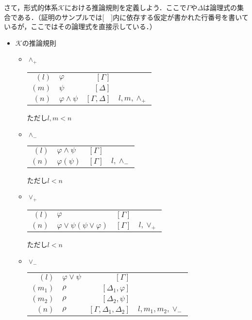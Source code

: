 \documentclass[10pt,b5paper,papersize,dvipdfmx]{jsbook}
\begin{document}
さて，形式的体系$\mathcal K$における推論規則を定義しよう．ここで$\Gamma$や$\Delta$は論理式の集合である．（証明のサンプルでは[　]内に依存する仮定が書かれた行番号を書いているが，ここではその論理式を直接示している．）
\begin{itemize}
\item $\mathcal K$の推論規則
\begin{itemize}
\item $\land_+$
\begin{table}[H]
\begin{center}
\begin{tabular}{rlrl}
$(l)$&$\varphi$&$[\Gamma]$& \\
$(m)$&$\psi$&$[\Delta]$& \\
$(n)$&$\varphi \land \psi$&$[\Gamma,\Delta]$&$l,m,\land_+$
\end{tabular}
\end{center}
\end{table}
ただし$l,m<n$
\item $\land_-$
\begin{table}[H]
\begin{center}
\begin{tabular}{rlrl}
$(l)$&$\varphi \land \psi$&$[\Gamma]$& \\
$(n)$&$\varphi (\psi)$&$[\Gamma]$&$l,\land_-$ \\
\end{tabular}
\end{center}
\end{table}
ただし$l<n$
\item $\lor_+$
\begin{table}[H]
\begin{center}
\begin{tabular}{rlrl}
$(l)$&$\varphi$&$[\Gamma]$& \\
$(n)$&$\varphi \lor \psi (\psi \lor \varphi)$&$[\Gamma]$&$l,\lor_+$
\end{tabular}
\end{center}
\end{table}
ただし$l<n$
\item $\lor_-$
\begin{table}[H]
\begin{center}
\begin{tabular}{rlrl}
$(l)$&$\varphi \lor \psi$&$[\Gamma]$& \\
$(m_1)$&$\rho$&$[\Delta_1,\varphi]$& \\
$(m_2)$&$\rho$&$[\Delta_2,\psi]$& \\
$(n)$&$\rho$&$[\Gamma,\Delta_1,\Delta_2]$&$l,m_1,m_2,\lor_-$

\end{tabular}
\end{center}
\end{table}
\end{itemize}
\end{itemize}
\end{document}
